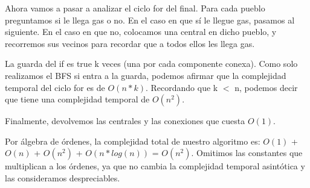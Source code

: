 Ahora vamos a pasar a analizar el ciclo for del final. Para cada pueblo preguntamos si le llega gas o no. En el caso en que sí le llegue gas, pasamos al siguiente. En el caso en que no, colocamos una central en dicho pueblo, y recorremos sus vecinos para recordar que a todos ellos les llega gas.

La guarda del if es true k veces (una por cada componente conexa). Como solo realizamos el BFS si entra a la guarda, podemos afirmar que la complejidad temporal del ciclo for es de $O(n*k)$. Recordando que k $<$ n, podemos decir que tiene una complejidad temporal de $O(n^2)$.

Finalmente, devolvemos las centrales y las conexiones que cuesta $O(1)$.

Por álgebra de órdenes, la complejidad total de nuestro algoritmo es: $O(1)$ + $O(n)$ + $O(n^2)$ + $O(n*log(n))$ = $O(n^2)$. Omitimos las constantes que multiplican a los órdenes, ya que no cambia la complejidad temporal asintótica y las consideramos despreciables.